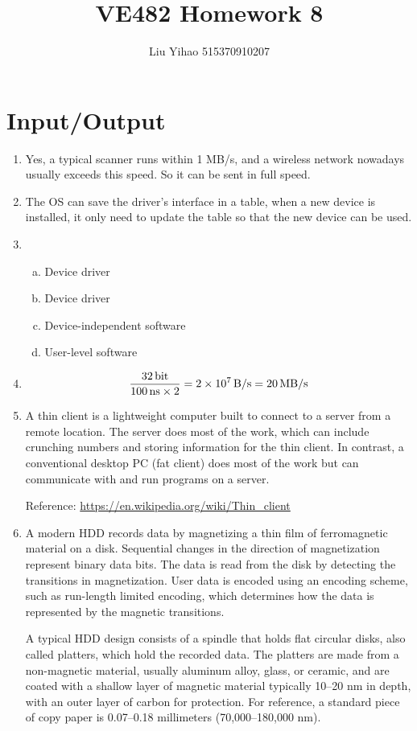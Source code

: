\documentclass{article}
\title{VE482 Homework 8}
\author{Liu Yihao 515370910207}
\date{}
\newcommand{\unit}[1]{{\rm\,#1}}
\begin{document}
\maketitle

\section{Input/Output}
\begin{enumerate}
\item
Yes, a typical scanner runs within 1 MB/s, and a wireless network nowadays usually exceeds this speed. So it can be sent in full speed.
\item
The OS can save the driver's interface in a table, when a new device is installed, it only need to update the table so that the new device can be used.
\item
\begin{enumerate}[(a)]
\item Device driver
\item Device driver
\item Device-independent software
\item User-level software
\end{enumerate}
\item
$$\frac{32\unit{bit}}{100\unit{ns}\times2}=2\times10^7\unit{B/s}=20\unit{MB/s}$$
\item
A thin client is a lightweight computer built to connect to a server from a remote location. The server does most of the work, which can include crunching numbers and storing information for the thin client. In contrast, a conventional desktop PC (fat client) does most of the work but can communicate with and run programs on a server.

Reference: \url{https://en.wikipedia.org/wiki/Thin_client}
\item
A modern HDD records data by magnetizing a thin film of ferromagnetic material on a disk. Sequential changes in the direction of magnetization represent binary data bits. The data is read from the disk by detecting the transitions in magnetization. User data is encoded using an encoding scheme, such as run-length limited encoding, which determines how the data is represented by the magnetic transitions.

A typical HDD design consists of a spindle that holds flat circular disks, also called platters, which hold the recorded data. The platters are made from a non-magnetic material, usually aluminum alloy, glass, or ceramic, and are coated with a shallow layer of magnetic material typically 10–20 nm in depth, with an outer layer of carbon for protection. For reference, a standard piece of copy paper is 0.07–0.18 millimeters (70,000–180,000 nm).


\end{enumerate}
\end{document}
